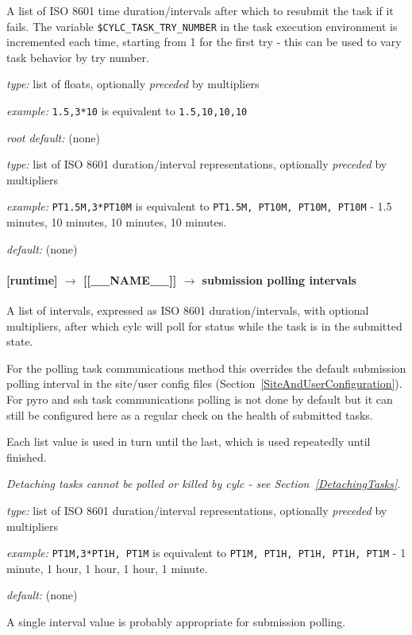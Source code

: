 A list of ISO 8601 time duration/intervals after which to resubmit the task
if it fails. The variable \lstinline=$CYLC_TASK_TRY_NUMBER= in the task
execution environment is incremented each time, starting from 1 for the
first try - this can be used to vary task behavior by try number.

\begin{myitemize}
\item {\em type:} list of floats, optionally {\em preceded} by multipliers
\item {\em example:} \lstinline=1.5,3*10= is equivalent to \lstinline=1.5,10,10,10=
\item {\em root default:} (none)
\end{myitemize}

\begin{myitemize}
    \item {\em type:} list of ISO 8601 duration/interval representations,
    optionally {\em preceded} by multipliers
    \item {\em example:} \lstinline=PT1.5M,3*PT10M= is equivalent to
    \lstinline=PT1.5M, PT10M, PT10M, PT10M= - 1.5 minutes, 10 minutes,
    10 minutes, 10 minutes.
    \item {\em default:} (none)
\end{myitemize}

\paragraph[submission polling intervals]{[runtime] $\rightarrow$ [[\_\_NAME\_\_]] $\rightarrow$ submission polling intervals}
\label{SubmissionPollingIntervals}

A list of intervals, expressed as ISO 8601 duration/intervals, with optional
multipliers, after which cylc will poll for status while the task is in the
submitted state.

For the polling task communications method this overrides the default
submission polling interval in the site/user config files
(Section~\ref{SiteAndUserConfiguration}). For pyro and ssh task communications
polling is not done by default but it can still be configured here as a
regular check on the health of submitted tasks.

Each list value is used in turn until the last, which is used repeatedly
until finished.

{\em Detaching tasks cannot be polled or killed by cylc -
see Section~\ref{DetachingTasks}.}

\begin{myitemize}
    \item {\em type:} list of ISO 8601 duration/interval representations,
    optionally {\em preceded} by multipliers
    \item {\em example:} \lstinline=PT1M,3*PT1H, PT1M= is equivalent to
    \lstinline=PT1M, PT1H, PT1H, PT1H, PT1M= - 1 minute, 1 hour, 1 hour, 1
    hour, 1 minute.
    \item {\em default:} (none)
\end{myitemize}
A single interval value is probably appropriate for submission polling.

